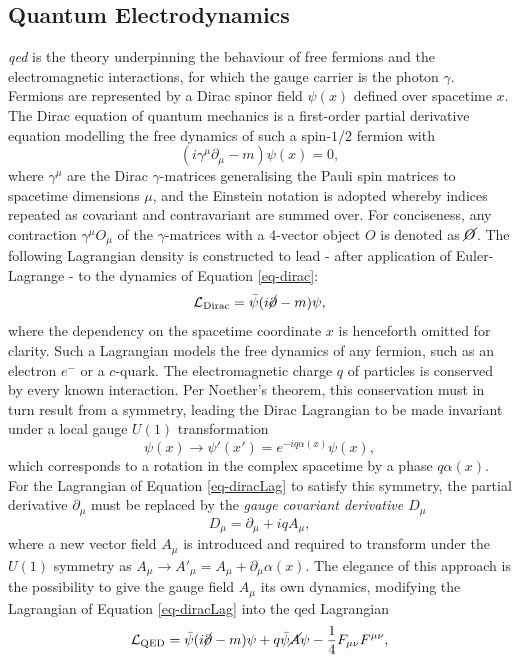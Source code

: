 \subsection{Quantum Electrodynamics}\label{subsec-QED}
\textit{\gls{qed}} is the theory underpinning the behaviour of free fermions and the electromagnetic interactions, for which the gauge carrier is the photon $\gamma$. Fermions are represented by a Dirac spinor field $\psi(x)$ defined over spacetime $x$. The Dirac equation of quantum mechanics is a first-order partial derivative equation modelling the free dynamics of such a spin-$1/2$ fermion with
\begin{equation}\label{eq-dirac}
    (i\gamma^{\mu} \partial_{\mu} - m) \psi(x) = 0,
\end{equation}
where $\gamma^{\mu}$ are the Dirac $\gamma$-matrices generalising the Pauli spin matrices to spacetime dimensions $\mu$, and the Einstein notation is adopted whereby indices repeated as covariant and contravariant are summed over. For conciseness, any contraction $\gamma^{\mu} O_{\mu}$ of the $\gamma$-matrices with a 4-vector object $O$ is denoted as $\cancel{O}$. The following Lagrangian density is constructed to lead - after application of Euler-Lagrange - to the dynamics of Equation \ref{eq-dirac}:
\begin{equation}\label{eq-diracLag}
   \mathcal{L}_{\text{Dirac}} = \bar{\psi} (i \cancel{\partial}- m) \psi,
\end{equation}
where the dependency on the spacetime coordinate $x$ is henceforth omitted for clarity. Such a Lagrangian models the free dynamics of any fermion, such as an electron $e^-$ or a $c$-quark. The electromagnetic charge $q$ of particles is conserved by every known interaction. Per Noether's theorem, this conservation must in turn result from a symmetry, leading the Dirac Lagrangian to be made invariant under a local gauge $U(1)$ transformation
\begin{equation}\label{eq-GaugeU1}
    \psi(x) \rightarrow \psi'(x') = e^{-iq\alpha(x)} \psi(x),
\end{equation}
which corresponds to a rotation in the complex spacetime by a phase $q\alpha(x)$. For the Lagrangian of Equation \ref{eq-diracLag} to satisfy this symmetry, the partial derivative $\partial_{\mu}$ must be replaced by the \textit{gauge covariant derivative $D_{\mu}$}
\begin{equation}\label{eq-CoDerU1}
    D_{\mu} = \partial_{\mu} + iqA_{\mu},
\end{equation}
where a new vector field $A_{\mu}$ is introduced and required to transform under the $U(1)$ symmetry as $A_{\mu} \rightarrow A'_{\mu} = A_{\mu} + \partial_{\mu} \alpha(x)$. The elegance of this approach is the possibility to give the gauge field $A_{\mu}$ its own dynamics, modifying the Lagrangian of Equation \ref{eq-diracLag} into the \gls{qed} Lagrangian \[ \mathcal{L}_{\text{QED}} = \bar{\psi} (i \cancel{\partial}- m) \psi + q \bar{\psi} \cancel{A} \psi - \frac{1}{4} F_{\mu\nu} F^{\mu\nu}, \]
